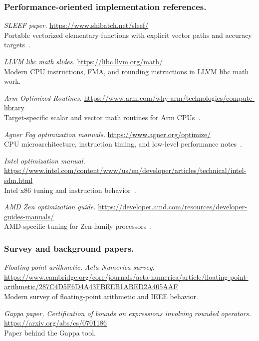 \documentclass[manuscript, nonacm]{acmart}
\begin{document}
    \subsubsection{Performance-oriented implementation references.}

    \emph{SLEEF paper.}
    \url{https://www.shibatch.net/sleef/}\\
    Portable vectorized elementary functions with explicit vector paths and
    accuracy targets~\cite{sleef}.

    \emph{LLVM libc math slides.}
    \url{https://libc.llvm.org/math/}\\
    Modern CPU instructions, FMA, and rounding instructions in LLVM libc math
    work.

    \emph{Arm Optimized Routines.}
    \url{https://www.arm.com/why-arm/technologies/compute-library}\\
    Target-specific scalar and vector math routines for Arm CPUs~\cite{arm}.

    \emph{Agner Fog optimization manuals.}
    \url{https://www.agner.org/optimize/}\\
    CPU microarchitecture, instruction timing, and low-level performance
    notes~\cite{fog}.

    \emph{Intel optimization manual.}
    \url{https://www.intel.com/content/www/us/en/developer/articles/technical/intel-sdm.html}\\
    Intel x86 tuning and instruction behavior~\cite{intel}.

    \emph{AMD Zen optimization guide.}
    \url{https://developer.amd.com/resources/developer-guides-manuals/}\\
    AMD-specific tuning for Zen-family processors~\cite{amd}.

    \subsubsection{Survey and background papers.}

    \emph{Floating-point arithmetic, Acta Numerica survey.}
    \url{https://www.cambridge.org/core/journals/acta-numerica/article/floating-point-arithmetic/287C4D5F6D4A43FBEEB1ABED2A405AAF}\\
    Modern survey of floating-point arithmetic and IEEE behavior.

    \emph{Gappa paper, Certification of bounds on expressions involving rounded
    operators.}
    \url{https://arxiv.org/abs/cs/0701186}\\
    Paper behind the Gappa tool.
\end{document}

